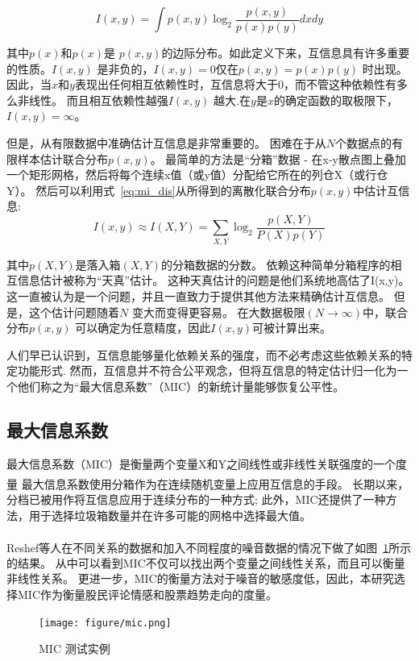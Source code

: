 \documentclass[cs4size,a4paper]{ctexart}
\numberwithin{equation}{section}
\numberwithin{table}{section}
\numberwithin{figure}{section}
\newcommand{\upcite}[1]{\textsuperscript{\textsuperscript{\cite{#1}}}}%
\begin{document}
\begin{equation}\label{eq:mi}
  I(x,y) = \int p(x,y)\log_{2}\frac{p(x,y)}{p(x)p(y)} dx dy
\end{equation}

其中$p(x)$和$p(x)$是 $p(x,y)$的边际分布。如此定义下来，互信息具有许多重要的性质。$I(x,y)$ 是非负的，$I(x,y) = 0$仅在$p(x,y)= p(x)p(y)$ 时出现。 因此，当$x$和$y$表现出任何相互依赖性时，互信息将大于$0$，而不管这种依赖性有多么非线性。 而且相互依赖性越强$I(x,y)$ 越大.在$y$是$x$的确定函数的取极限下，$I(x,y) = \infty$。

但是，从有限数据中准确估计互信息是非常重要的。 困难在于从$N$个数据点的有限样本估计联合分布$p(x,y)$。 最简单的方法是“分箱”数据 - 在x-y散点图上叠加一个矩形网格，然后将每个连续x值（或y值）分配给它所在的列仓X（或行仓Y）。 然后可以利用式~\ref{eq:mi_dis}从所得到的离散化联合分布$p(x,y)$中估计互信息:
\begin{equation}\label{eq:mi_dis}
  I(x,y) \approx I(X,Y) = \sum_{X,Y}\log_{2}\frac{p(X,Y)}{P(X)p(Y)}
\end{equation}

其中$p(X,Y)$是落入箱$(X,Y)$的分箱数据的分数。 依赖这种简单分箱程序的相互信息估计被称为“天真”估计。 这种天真估计的问题是他们系统地高估了I(x,y)。 这一直被认为是一个问题，并且一直致力于提供其他方法来精确估计互信息。 但是，这个估计问题随着$N$ 变大而变得更容易。 在大数据极限$(N\to \infty)$中，联合分布$p(x,y)$ 可以确定为任意精度，因此$I(x,y)$可被计算出来。


人们早已认识到，互信息能够量化依赖关系的强度，而不必考虑这些依赖关系的特定功能形式. 然而，互信息并不符合公平观念，但将互信息的特定估计归一化为一个他们称之为“最大信息系数”（MIC）的新统计量能够恢复公平性。

\subsection{最大信息系数}

最大信息系数（MIC）是衡量两个变量X和Y之间线性或非线性关联强度的一个度量\upcite{reshef2011detecting}
最大信息系数使用分箱作为在连续随机变量上应用互信息的手段。 长期以来，分档已被用作将互信息应用于连续分布的一种方式; 此外，MIC还提供了一种方法，用于选择垃圾箱数量并在许多可能的网格中选择最大值。

Reshef等人\upcite{reshef2011detecting}在不同关系的数据和加入不同程度的噪音数据的情况下做了如图~\ref{fig:mic}所示的结果。
从中可以看到MIC不仅可以找出两个变量之间线性关系，而且可以衡量非线性关系。
更进一步，MIC的衡量方法对于噪音的敏感度低，因此，本研究选择MIC作为衡量股民评论情感和股票趋势走向的度量。
\begin{figure}
  \centering
  \texttt{[image: figure/mic.png]}
\caption{MIC 测试实例}
\label{fig:mic}
\end{figure}
\end{document}
